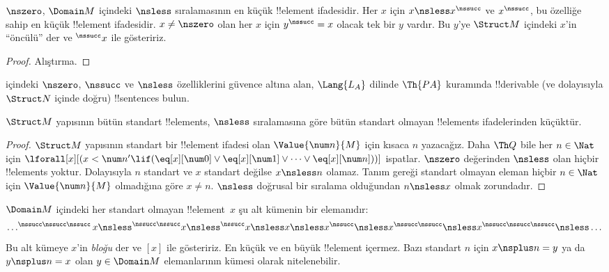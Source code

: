 \documentclass[../../../include/open-logic-section]{subfiles}
\begin{document}
\begin{prop}
 $\nszero$, $\Domain M$ içindeki
$\nsless$ sıralamasının en küçük !!{element} ifadesidir. Her $x$ için
$x\nsless x^\nssucc$ ve $x^\nssucc$, bu özelliğe sahip en küçük
!!{element} ifadesidir. $x\neq\nszero$ olan her $x$ için
$y^\nssucc=x$ olacak tek bir $y$ vardır. Bu $y$'ye $\Struct M$
içindeki $x$'in ``öncülü'' der ve $^\nssucc x$ ile gösteririz.
\end{prop}

\begin{proof}
Alıştırma.
\end{proof}

\begin{prob}
 içindeki $\nszero$, $\nssucc$
ve $\nsless$ özelliklerini güvence altına alan, $\Lang{L_A}$ dilinde
$\Th{PA}$ kuramında !!{derivable} (ve dolayısıyla $\Struct N$ içinde
doğru) !!{sentence}s bulun.
\end{prob}

\begin{prop}
$\Struct M$ yapısının bütün standart !!{element}s, $\nsless$
sıralamasına göre bütün standart olmayan !!{element}s ifadelerinden
küçüktür.
\end{prop}

\begin{proof}
$\Struct M$ yapısının standart bir !!{element} ifadesi olan
$\Value{\num n}{M}$ için kısaca $n$ yazacağız. Daha $\Th Q$ bile her
$n\in\Nat$ için
$\lforall[x][(x<\num n'\lif(\eq[x][\num0]\lor\eq[x][\num1]
\lor\dots\lor\eq[x][\num n]))]$ ispatlar. $\nszero$ değerinden
$\nsless$ olan hiçbir !!{element}s yoktur. Dolayısıyla $n$ standart ve
$x$ standart değilse $x\nsless n$ olamaz. Tanım gereği standart
olmayan eleman hiçbir $n\in\Nat$ için $\Value{\num n}{M}$ olmadığına
göre $x\neq n$. $\nsless$ doğrusal bir sıralama olduğundan
$n\nsless x$ olmak zorundadır.
\end{proof}

\begin{prop}
$\Domain M$ içindeki her standart olmayan !!{element}~$x$ şu alt
kümenin bir elemanıdır:
\[
\dots ^{\nssucc\nssucc\nssucc}x \nsless ^{\nssucc\nssucc}x \nsless
^{\nssucc}x \nsless x \nsless x^{\nssucc} \nsless x^{\nssucc\nssucc}
\nsless x^{\nssucc\nssucc\nssucc} \nsless \dots
\]
Bu alt kümeye $x$'in \emph{bloğu} der ve $[x]$ ile gösteririz. En küçük
ve en büyük !!{element} içermez. Bazı standart $n$ için
$x\nsplus n=y$ ya da $y\nsplus n=x$ olan $y\in\Domain M$
elemanlarının kümesi olarak nitelenebilir.
\end{prop}
\end{document}

